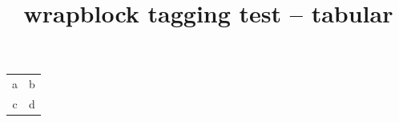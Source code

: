 \documentclass{article}
\title{wrapblock tagging test -- tabular}
\begin{document}
\kant[1]
\begin{wrapblock}{%
  \begin{tabular}{cc}
  a & b\\
  c & d
  \end{tabular}}
\kant[2-3]
\end{wrapblock}
\kant[4]
\end{document}
